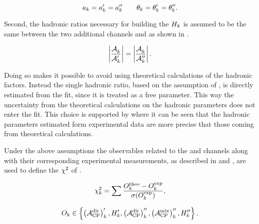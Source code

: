 \begin{equation}
a_k= a_k' = a_k'' \qquad \theta_k = \theta_k' = \theta_k''.
\label{su3_apply}
\end{equation}

\noindent Second, the hadronic ratios necessary for building the $H_{k}$ is assumed to be the same between
the two additional channels \BsJpsiKst and \BdJpsiRho as shown in .

\begin{equation}
  \centering
  \hadRatio{k}{}{\prime} =
  \hadRatio{k}{}{\prime\prime}.
    \label{had_ratios_assuption}
\end{equation}

\noindent Doing so makes it possible to avoid using theoretical calculations of the hadronic factors.
Instead the single hadronic ratio, based on the assumption of , is directly
estimated from the fit, since it is treated as a free parameter. This way the uncertainty from the theoretical
calculations on the hadronic parameters does not enter the fit. This choice is supported by\cite{DeBruyn-thesis}
where it can be seen that the hadronic parameters estimated form experimental data are more precise
that those coming from theoretical calculations.

Under the above assumptions the observables related to the \BsJpsiKst and \BdJpsiRho channels along
with their corresponding experimental measurements, as described in  and
, are used to define the $\chi^2$ of .

\begin{equation}
  \centering
  \chisq_k = \sum \frac{O^{\rm theo}_k - O^{\rm exp}_k} {\sigma(O^{\rm exp}_k)},
  \label{chisq_form}
\end{equation}


\begin{equation}
  \centering
  O_k \in \left\{ \parenthesis{\Acp{\rm dir}}'_k, \Hobs{k}', \parenthesis{\Acp{\rm dir}}''_k, \parenthesis{\Acp{\rm mix}}''_k, \Hobs{k}'' \right\}.
  \label{chisq_form_with}
\end{equation}


